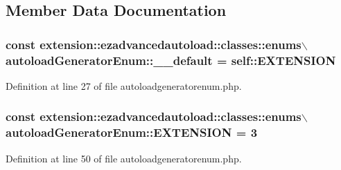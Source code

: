 \subsection{\-Member \-Data \-Documentation}
\hypertarget{classextension_1_1ezadvancedautoload_1_1classes_1_1enums_1_1autoload_generator_enum_a99b9d1e88c88539f6c95156361e2a73d}{
\subsubsection[{\-\_\-\-\_\-default}]{\setlength{\rightskip}{0pt plus 5cm}const extension\-::ezadvancedautoload\-::classes\-::enums$\backslash${\bf autoload\-Generator\-Enum\-::\-\_\-\-\_\-default} = self\-::\-E\-X\-T\-E\-N\-S\-I\-O\-N}}\label{classextension_1_1ezadvancedautoload_1_1classes_1_1enums_1_1autoload_generator_enum_a99b9d1e88c88539f6c95156361e2a73d}


\-Definition at line 27 of file autoloadgeneratorenum.\-php.

\hypertarget{classextension_1_1ezadvancedautoload_1_1classes_1_1enums_1_1autoload_generator_enum_af35752c8d16daa4d2f30d351c3575cb3}{
\subsubsection[{\-E\-X\-T\-E\-N\-S\-I\-O\-N}]{\setlength{\rightskip}{0pt plus 5cm}const extension\-::ezadvancedautoload\-::classes\-::enums$\backslash${\bf autoload\-Generator\-Enum\-::\-E\-X\-T\-E\-N\-S\-I\-O\-N} = 3}}\label{classextension_1_1ezadvancedautoload_1_1classes_1_1enums_1_1autoload_generator_enum_af35752c8d16daa4d2f30d351c3575cb3}


\-Definition at line 50 of file autoloadgeneratorenum.\-php.

